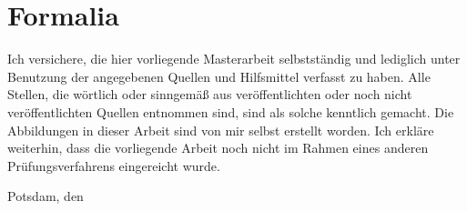 \documentclass[a4paper]{article}
\begin{document}
\section*{Formalia}

Ich versichere, die hier vorliegende Masterarbeit selbstständig und lediglich unter Benutzung der angegebenen Quellen und Hilfsmittel verfasst zu haben.
Alle Stellen, die wörtlich oder sinngemäß aus veröffentlichten oder noch nicht veröffentlichten Quellen entnommen sind, sind als solche kenntlich gemacht.
Die Abbildungen in dieser Arbeit sind von mir selbst erstellt worden.
Ich erkläre weiterhin, dass die vorliegende Arbeit noch nicht im Rahmen eines anderen Prüfungsverfahrens eingereicht wurde.

\vspace*{1\baselineskip}
Potsdam, den 


\pagebreak
\end{document}

